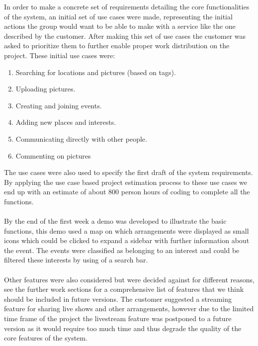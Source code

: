 In order to make a concrete set of requirements detailing the core functionalities of the system, an initial set of use cases were made, representing the initial actions the group would want to be able to make with a service like the one described by the customer. After making this set of use cases the customer was asked to prioritize them to further enable proper work distribution on the project. These initial use cases were:

\begin{enumerate}
  \item Searching for locations and pictures (based on tags).
  \item Uploading pictures.
  \item Creating and joining events.
  \item Adding new places and interests.
  \item Communicating directly with other people.
  \item Commenting on pictures
\end{enumerate}

The use cases were also used to specify the first draft of the system requirements. By applying the use case based project estimation process to these use cases we end up with an estimate of about 800 person hours of coding to complete all the functions.
\paragraph{} By the end of the first week a demo was developed to illustrate the basic functions, this demo used a map on which arrangements were displayed as small icons which could be clicked to expand a sidebar with further information about the event. The events were classified as belonging to an interest and could be filtered these interests by using of a search bar.
\paragraph{} Other features were also considered but were decided against for different reasons, see the further work sections for a comprehensive list of features that we think should be included in future versions. The customer suggested a streaming feature for sharing live shows and other arrangements, however due to the limited time frame of the project the livestream feature was postponed to a future version as it would require too much time and thus degrade the quality of the core features of the system.

